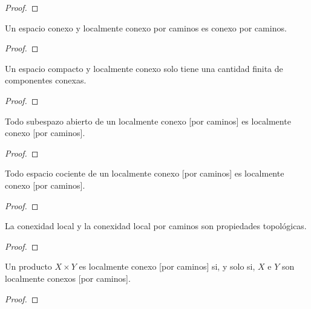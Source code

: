 \begin{proof}
\end{proof}
\begin{corolario}
    Un espacio conexo y localmente conexo por caminos es conexo por caminos.
\end{corolario}
\begin{proof}
\end{proof}
\begin{proposición}
    Un espacio compacto y localmente conexo solo tiene una cantidad finita de componentes conexas.
\end{proposición}
\begin{proof}
\end{proof}
\begin{proposición}
    Todo subespazo abierto de un localmente conexo [por caminos] es localmente conexo [por caminos].
\end{proposición}
\begin{proof}
\end{proof}
\begin{proposición}
    Todo espacio cociente de un localmente conexo [por caminos] es localmente conexo [por caminos].
\end{proposición}
\begin{proof}
\end{proof}
\begin{corolario}
    La conexidad local y la conexidad local por caminos son propiedades topológicas.
\end{corolario}
\begin{proof}
\end{proof}
\begin{proposición}
    Un producto $X \times Y$ es localmente conexo [por caminos] si, y solo si, $X$ e $Y$ son localmente conexos [por caminos].
\end{proposición}
\begin{proof}
\end{proof}
